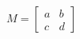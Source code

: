 \documentclass[preview]{standalone}
\begin{document}
\begin{align*}
M = \begin{bmatrix} a & b \\ c & d \end{bmatrix}
\end{align*}
\end{document}
